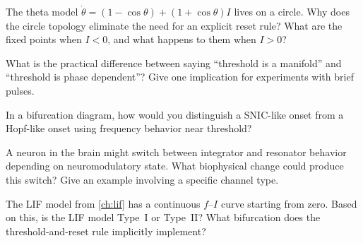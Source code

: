 \begin{conceptquestions}
  \item The theta model $\dot{\theta} = (1 - \cos\theta) + (1 + \cos\theta)I$ lives on a circle. Why does the circle topology eliminate the need for an explicit reset rule? What are the fixed points when $I < 0$, and what happens to them when $I > 0$?

  \item What is the practical difference between saying ``threshold is a manifold'' and ``threshold is phase dependent''? Give one implication for experiments with brief pulses.

  \item In a bifurcation diagram, how would you distinguish a SNIC-like onset from a Hopf-like onset using frequency behavior near threshold?

  \item A neuron in the brain might switch between integrator and resonator behavior depending on neuromodulatory state. What biophysical change could produce this switch? Give an example involving a specific channel type.

  \item The LIF model from \cref{ch:lif} has a continuous $f$--$I$ curve starting from zero. Based on this, is the LIF model Type~I or Type~II? What bifurcation does the threshold-and-reset rule implicitly implement?
\end{conceptquestions}
